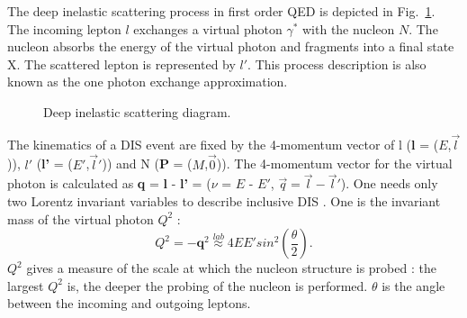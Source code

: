 The deep inelastic scattering process in first order QED is depicted in Fig.~\ref{pic:DIS}. The incoming lepton $l$ exchanges a virtual photon $\gamma^*$ with the nucleon $N$. The nucleon absorbs the energy of the virtual photon and fragments into a final state X. The scattered lepton is represented by $l'$. This process description is also known as the one photon exchange approximation.

\begin{figure}[!h]
  \centering

	\caption{Deep inelastic scattering diagram.}
	\label{pic:DIS}
\end{figure}

The kinematics of a DIS event are fixed by the 4-momentum vector of l (\textbf{l} = ($E$,$\vec{l}$)), $l'$ (\textbf{l'} = ($E'$,$\vec{l}'$)) and N (\textbf{P} = ($M$,$\vec{0}$)). The 4-momentum vector for the virtual photon is calculated as \textbf{q} = \textbf{l} - \textbf{l'} = ($\nu$ = $E$ - $E'$, $\vec{q}=\vec{l}-\vec{l}'$). One needs only two Lorentz invariant variables to describe inclusive DIS \cite{DISmeas}. One is the invariant mass of the virtual photon $Q^2$ :
%
\begin{equation}
  Q^2 = -\textbf{q}^2 \stackrel{lab}{\approx} 4EE'sin^2\left(\frac{\theta}{2}\right).
\end{equation}
%
$Q^2$ gives a measure of the scale at which the nucleon structure is probed : the largest $Q^2$ is, the deeper the probing of the nucleon is performed. $\theta$ is the angle between the incoming and outgoing leptons.

